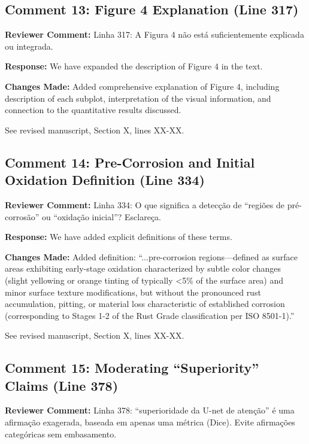 \documentclass[11pt]{article}
\newcommand{\reviewercomment}[1]{\textcolor{reviewercolor}{\textbf{Reviewer Comment:} #1}}
\newcommand{\response}[1]{\textcolor{responsecolor}{\textbf{Response:} #1}}
\newcommand{\change}[1]{\textcolor{changecolor}{\textbf{Changes Made:} #1}}
\begin{document}
\subsection{Comment 13: Figure 4 Explanation (Line 317)}

\reviewercomment{Linha 317: A Figura 4 não está suficientemente explicada ou integrada.}

\response{We have expanded the description of Figure 4 in the text.}

\change{Added comprehensive explanation of Figure 4, including description of each subplot, interpretation of the visual information, and connection to the quantitative results discussed.

See revised manuscript, Section X, lines XX-XX.}

\subsection{Comment 14: Pre-Corrosion and Initial Oxidation Definition (Line 334)}

\reviewercomment{Linha 334: O que significa a detecção de ``regiões de pré-corrosão'' ou ``oxidação inicial''? Esclareça.}

\response{We have added explicit definitions of these terms.}

\change{Added definition: ``...pre-corrosion regions—defined as surface areas exhibiting early-stage oxidation characterized by subtle color changes (slight yellowing or orange tinting of typically <5\% of the surface area) and minor surface texture modifications, but without the pronounced rust accumulation, pitting, or material loss characteristic of established corrosion (corresponding to Stages 1-2 of the Rust Grade classification per ISO 8501-1).''

See revised manuscript, Section X, lines XX-XX.}

\subsection{Comment 15: Moderating ``Superiority'' Claims (Line 378)}

\reviewercomment{Linha 378: ``superioridade da U-net de atenção'' é uma afirmação exagerada, baseada em apenas uma métrica (Dice). Evite afirmações categóricas sem embasamento.}
\end{document}
